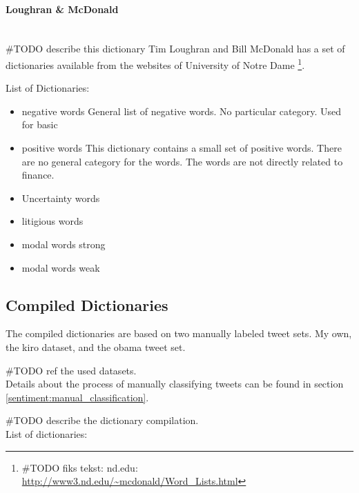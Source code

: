 \paragraph{Loughran & McDonald}
\hspace{0pt}\\
#TODO describe this dictionary
Tim Loughran and Bill McDonald has a set of dictionaries available from the
websites of University of Notre Dame \footnote{#TODO fiks tekst: nd.edu:
\url{http://www3.nd.edu/~mcdonald/Word_Lists.html}}. 

List of Dictionaries:
\begin{itemize}
    \item negative words
General list of negative words. No particular category. Used for basic   
    \item positive words
This dictionary contains a small set of positive words. There are no general
category for the words. The words are not directly related to finance. 
    \item Uncertainty words
    \item litigious words
    \item modal words strong
    \item modal words weak
\end{itemize}
%

\subsection{Compiled Dictionaries}
The compiled dictionaries are based on two manually labeled tweet sets. My own,
the kiro dataset, and the obama tweet set.
 
#TODO ref the used datasets.\\ 

Details about the process of manually classifying tweets can be found in section
\ref{sentiment:manual_classification}.

#TODO describe the dictionary compilation.\\


List of dictionaries:

